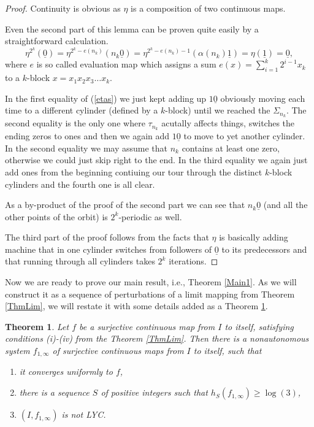 \documentclass{amsart}
\newtheorem{theorem}{Theorem}
\begin{document}
\begin{proof}
Continuity is obvious as $\eta$ is a composition of two continuous maps.

Even the second part of this lemma can be proven quite easily by a straightforward calculation.
\begin{equation} \label{etas} \eta^{2^k}(\underline{0}) = \eta^{2^k - e(n_k)}(n_k\underline{0}) = \eta^{2^k - e(n_k) - 1}(\alpha(n_k)\underline{1}) = \eta(\underline{1}) = \underline{0}, \end{equation}
where $e$ is so called evaluation map which assigns a sum $e(x) = \sum_{i=1}^k 2^{i-1} x_k$ to a $k$-block $x = x_1 x_2 x_3\dots x_k $.

In the first equality of (\ref{etas}) we just kept adding up $1\underline{0}$ obviously moving each time to a different cylinder (defined by a $k$-block) until we reached the $\Sigma_{n_k}$. The second equality is the only one where $\tau_{n_k}$ acutally affects things, switches the ending zeros to ones and then we again add $1\underline{0}$ to move to yet another cylinder. In the second equality we may assume that $n_k$ contains at least one zero, otherwise we could just skip right to the end. In the third equality we again just add ones from the beginning contiuing our tour through the distinct $k$-block cylinders and the fourth one is all clear.

As a by-product of the proof of the second part we can see that $n_k\underline{0}$ (and all the other points of the orbit) is $2^k$-periodic as well.

The third part of the proof follows from the facts that $\eta$ is basically adding machine that in one cylinder switches from followers of $\underline{0}$ to its predecessors and that running through all cylinders takes $2^k$ iterations.
\end{proof}

Now we are ready to prove our main result, i.e., Theorem \ref{Main1}. As we will construct it as a sequence of perturbations of a limit mapping from Theorem \ref{ThmLim}, we will restate it with some details added as a Theorem \ref{Main2}.

\begin{theorem}
\label{Main2}
Let $f$ be a surjective continuous map from $I$ to itself, satisfying conditions (i)-(iv) from the Theorem \ref{ThmLim}. Then there is a nonautonomous system $f_{1,\infty}$ of surjective continuous maps from $I$ to itself, such that
\begin{enumerate}
\item it converges uniformly to $f$,
\item there is a sequence $S$ of positive integers such that $h_S(f_{1,\infty}) \geq \log(3)$,
\item $(I,f_{1,\infty})$ is not LYC.
\end{enumerate}
\end{theorem}
\end{document}
